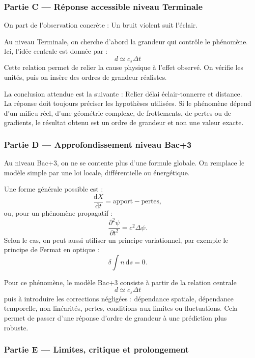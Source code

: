 \documentclass[11pt,a4paper]{article}
\begin{document}
\subsubsection*{Partie C — Réponse accessible niveau Terminale}

\begin{corrigebox}
On part de l'observation concrète : Un bruit violent suit l'éclair.

Au niveau Terminale, on cherche d'abord la grandeur qui contrôle le phénomène. Ici, l'idée centrale est donnée par :
\[
d\simeq c_s\Delta t
\]
Cette relation permet de relier la cause physique à l'effet observé. On vérifie les unités, puis on insère des ordres de grandeur réalistes.

La conclusion attendue est la suivante : Relier délai éclair-tonnerre et distance. La réponse doit toujours préciser les hypothèses utilisées. Si le phénomène dépend d'un milieu réel, d'une géométrie complexe, de frottements, de pertes ou de gradients, le résultat obtenu est un ordre de grandeur et non une valeur exacte.
\end{corrigebox}

\subsubsection*{Partie D — Approfondissement niveau Bac+3}

\begin{approfondissementbox}
Au niveau Bac+3, on ne se contente plus d'une formule globale. On remplace le modèle simple par une loi locale, différentielle ou énergétique.

Une forme générale possible est :
\[
\frac{\mathrm d X}{\mathrm dt}=\text{apport}-\text{pertes},
\]
ou, pour un phénomène propagatif :
\[
\frac{\partial^2 \psi}{\partial t^2}=c^2\Delta\psi.
\]
Selon le cas, on peut aussi utiliser un principe variationnel, par exemple le principe de Fermat en optique :
\[
\delta \int n\,\mathrm ds=0.
\]

Pour ce phénomène, le modèle Bac+3 consiste à partir de la relation centrale
\[
d\simeq c_s\Delta t
\]
puis à introduire les corrections négligées : dépendance spatiale, dépendance temporelle, non-linéarités, pertes, conditions aux limites ou fluctuations. Cela permet de passer d'une réponse d'ordre de grandeur à une prédiction plus robuste.
\end{approfondissementbox}

\subsubsection*{Partie E — Limites, critique et prolongement}
\end{document}
